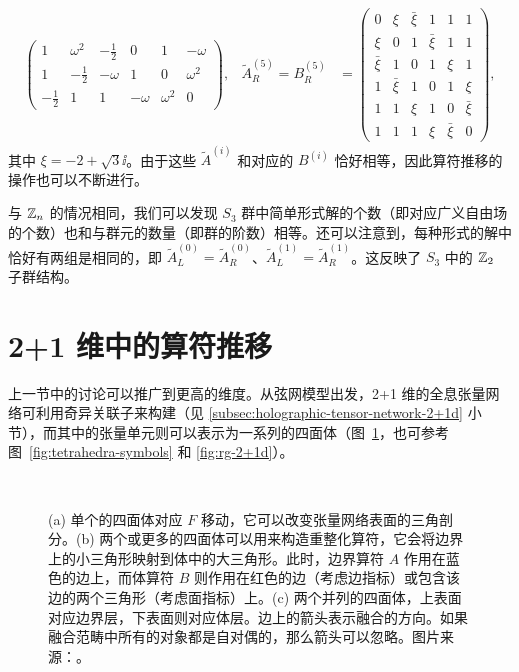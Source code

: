\begin{align}
\begin{pmatrix}
    1 & \omega^2 & -\frac12 & 0 & 1 & -\omega \\
    1 & -\frac12 & -\omega & 1 & 0 & \omega^2 \\
    -\frac12 & 1 & 1 & -\omega & \omega^2 & 0
  \end{pmatrix}, &
  \tilde{A}^{(5)}_R = B^{(5)}_R &= \begin{pmatrix}
    0 & \xi & \bar{\xi} & 1 & 1 & 1 \\
    \xi & 0 & 1 & \bar{\xi} & 1 & 1 \\
    \bar{\xi} & 1 & 0 & 1 & \xi & 1 \\
    1 & \bar{\xi} & 1 & 0 & 1 & \xi \\
    1 & 1 & \xi & 1 & 0 & \bar{\xi} \\
    1 & 1 & 1 & \xi & \bar{\xi} & 0
  \end{pmatrix},
\end{align}
其中 $\xi=-2+\sqrt3\ii$。由于这些 $\tilde{A}^{(i)}$ 和对应的 $B^{(i)}$ 恰好相等，因此算符推移的操作也可以不断进行。
\endgroup

与 $\mathbb{Z}_n$ 的情况相同，我们可以发现 $S_3$ 群中简单形式解的个数（即对应广义自由场的个数）也和与群元的数量（即群的阶数）相等。还可以注意到，每种形式的解中恰好有两组是相同的，即 $\tilde{A}^{(0)}_L=\tilde{A}^{(0)}_R$、$\tilde{A}^{(1)}_L=\tilde{A}^{(1)}_R$。这反映了 $S_3$ 中的 $\mathbb{Z}_2$ 子群结构。

\section{2+1 维中的算符推移}

上一节中的讨论可以推广到更高的维度。从弦网模型出发，2+1 维的全息张量网络可利用奇异关联子来构建（见 \ref{subsec:holographic-tensor-network-2+1d} 小节），而其中的张量单元则可以表示为一系列的四面体（图~\ref{fig:rg-2+1d-tetrahedra}，也可参考图~\ref{fig:tetrahedra-symbols} 和 \ref{fig:rg-2+1d}）。

\begin{figure}[htb]
  \centering
   \qquad
   \\[1ex]
  \caption[2+1 维全息张量网络中的四面体张量单元]{(a) 单个的四面体对应 $F$ 移动，它可以改变张量网络表面的三角剖分。(b) 两个或更多的四面体可以用来构造重整化算符，它会将边界上的小三角形映射到体中的大三角形。此时，边界算符 $A$ 作用在蓝色的边上，而体算符 $B$ 则作用在红色的边（考虑边指标）或包含该边的两个三角形（考虑面指标）上。(c) 两个并列的四面体，上表面对应边界层，下表面则对应体层。边上的箭头表示融合的方向。如果融合范畴中所有的对象都是自对偶的，那么箭头可以忽略。图片来源：\parencite{zeng2023bulk}。}
  \label{fig:rg-2+1d-tetrahedra}
\end{figure}

